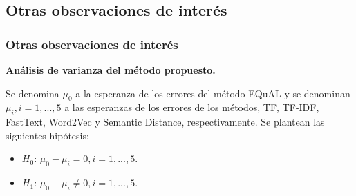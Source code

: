 \subsection{Otras observaciones de interés}
\begin{frame}
	\frametitle{Otras observaciones de interés}
	\textbf{Análisis de varianza del método propuesto.}
	\bigskip

	Se denomina \(\mu_0\) a la esperanza de los errores del método EQuAL y se denominan \(\mu_i, i = 1,..., 5\) a las esperanzas de los errores de los métodos, TF, TF-IDF, FastText, Word2Vec y Semantic Distance, respectivamente. Se plantean las siguientes hipótesis:
	\bigskip
	\begin{itemize}[<*>]
		\item \textbf{\(H_0\)}: \(\mu_0 - \mu_i = 0, i = 1,..., 5\).
		\item \textbf{\(H_1\)}: \(\mu_0 - \mu_i \neq 0, i = 1,..., 5\).
	\end{itemize}

	\framebreak


\end{frame}
